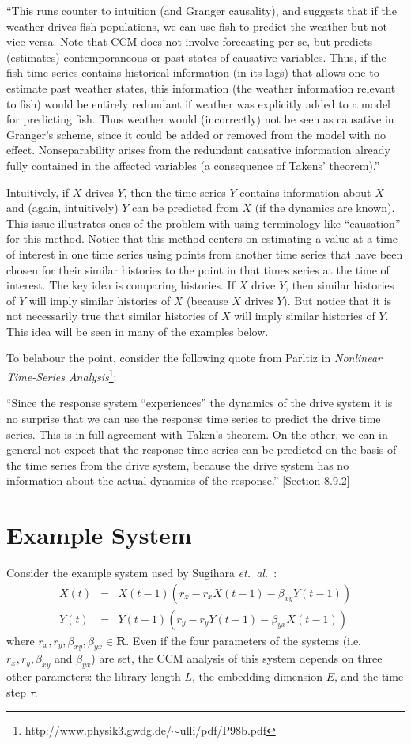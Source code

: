 \documentclass[a4paper,11pt]{article}
\begin{document}
``This runs counter to intuition (and Granger causality), and suggests that if the weather drives fish populations, we can use fish to predict the weather but not vice versa. Note that CCM does not involve forecasting per se, but predicts (estimates) contemporaneous or past states of causative variables. Thus, if the fish time series contains historical information (in its lags) that allows one to estimate past weather states, this information (the weather information relevant to fish) would be entirely redundant if weather was explicitly added to a model for predicting fish. Thus weather would (incorrectly) not be seen as causative in Granger’s scheme, since it could be
added or removed from the model with no effect. Nonseparability arises from the redundant causative information already fully contained in the affected variables (a consequence of Takens’ theorem).''

Intuitively, if $X$ drives $Y$, then the time series $Y$ contains information about $X$ and (again, intuitively) $Y$ can be predicted from $X$ (if the dynamics are known).  This issue illustrates ones of the problem with using terminology like ``causation'' for this method.  Notice that this method centers on estimating a value at a time of interest in one time series using points from another time series that have been chosen for their similar histories to the point in that times series at the time of interest.  The key idea is comparing histories.  If $X$ drive $Y$, then similar histories of $Y$ will imply similar histories of $X$ (because $X$ drives $Y$).  But notice that it is not necessarily true that similar histories of $X$ will imply similar histories of $Y$.  This idea will be seen in many of the examples below.

To belabour the point, consider the following quote from Parltiz in {\em Nonlinear Time-Series Analysis}\footnote{http://www.physik3.gwdg.de/$\sim$ulli/pdf/P98b.pdf}:

``Since the response system ``experiences'' the dynamics of the drive system it is no surprise that we can use the response time series to predict the drive time series.  This is in full agreement with Taken's theorem.  On the other, we can in general not expect that the response time series can be predicted on the basis of the time series from the drive system, because the drive system has no information about the actual dynamics of the response.'' [Section 8.9.2] 

\section{Example System}
Consider the example system used by Sugihara {\em et.\ al.\ }:
\begin{eqnarray*}
X(t) &=& X(t-1)\left(r_x-r_x X(t-1)-\beta_{xy} Y(t-1)\right)\\
Y(t) &=& Y(t-1)\left(r_y-r_y Y(t-1)-\beta_{yx} X(t-1)\right)
\end{eqnarray*}
where $r_x,r_y,\beta_{xy},\beta_{yx}\in\mathbf{R}$.  Even if the four parameters of the systems (i.e.\ $r_x,r_y,\beta_{xy}$ and $\beta_{yx}$) are set, the CCM analysis of this system depends on three other parameters: the library length $L$, the embedding dimension $E$, and the time step $\tau$.
\end{document}
